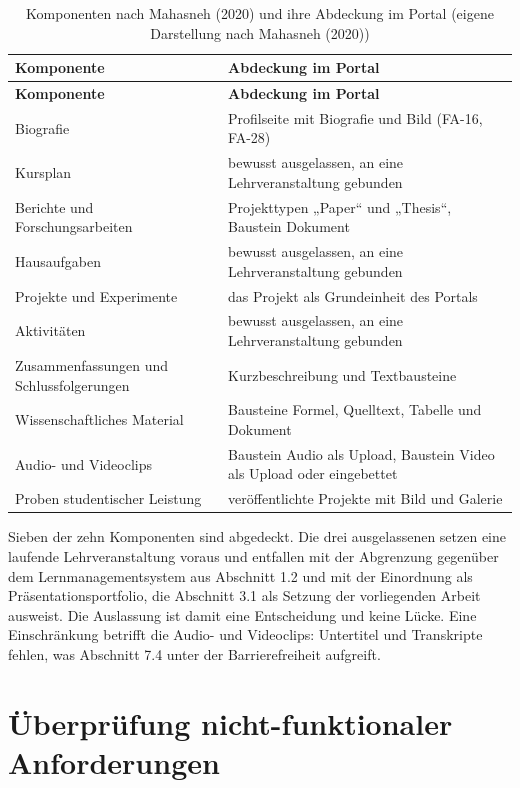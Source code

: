 \begingroup
\small
\setlength{\tabcolsep}{4pt}
\begin{longtable}{@{}L{5.4cm}L{9.2cm}@{}}
	\caption[Komponenten nach Mahasneh (2020) und ihre Abdeckung im Portal]{Komponenten nach Mahasneh (2020) und ihre Abdeckung im Portal (eigene Darstellung nach Mahasneh (2020))}
	\label{tab:komponenten}\\
	\toprule
	\textbf{Komponente} & \textbf{Abdeckung im Portal} \\
	\midrule
	\endfirsthead
	\toprule
	\textbf{Komponente} & \textbf{Abdeckung im Portal} \\
	\midrule
	\endhead
	\bottomrule
	\endfoot
	Biografie & Profilseite mit Biografie und Bild (FA-16, FA-28) \\
	Kursplan & bewusst ausgelassen, an eine Lehrveranstaltung gebunden \\
	Berichte und Forschungsarbeiten & Projekttypen „Paper“ und „Thesis“, Baustein Dokument \\
	Hausaufgaben & bewusst ausgelassen, an eine Lehrveranstaltung gebunden \\
	Projekte und Experimente & das Projekt als Grundeinheit des Portals \\
	Aktivitäten & bewusst ausgelassen, an eine Lehrveranstaltung gebunden \\
	Zusammenfassungen und Schlussfolgerungen & Kurzbeschreibung und Textbausteine \\
	Wissenschaftliches Material & Bausteine Formel, Quelltext, Tabelle und Dokument \\
	Audio- und Videoclips & Baustein Audio als Upload, Baustein Video als Upload oder eingebettet \\
	Proben studentischer Leistung & veröffentlichte Projekte mit Bild und Galerie \\
\end{longtable}
\endgroup

Sieben der zehn Komponenten sind abgedeckt. Die drei ausgelassenen setzen eine laufende Lehrveranstaltung voraus und entfallen mit der Abgrenzung gegenüber dem Lernmanagementsystem aus Abschnitt 1.2 und mit der Einordnung als Präsentationsportfolio, die Abschnitt 3.1 als Setzung der vorliegenden Arbeit ausweist. Die Auslassung ist damit eine Entscheidung und keine Lücke. Eine Einschränkung betrifft die Audio- und Videoclips: Untertitel und Transkripte fehlen, was Abschnitt 7.4 unter der Barrierefreiheit aufgreift.

\section{Überprüfung nicht-funktionaler Anforderungen}
\label{sec:ueberpruefung-nfa}

